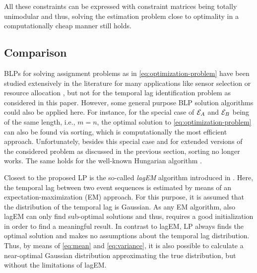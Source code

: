 \documentclass[journal, 10pt]{IEEEtran}
\begin{document}
All these constraints can be expressed with constraint matrices being totally unimodular and thus, solving the estimation problem close to optimality in a computationally cheap manner still holds.


\subsection{Comparison}
\label{sec:lp_comparison}
%
BLPs for solving assignment problems as in \eqref{eq:optimization-problem} have been studied extensively in the literature for many applications like sensor selection \cite{Moon2017} or resource allocation \cite{Sultan2011}, but not for the temporal lag identification problem as considered in this paper. However, some general purpose BLP solution algorithms could also be applied here. For instance, for the special case of $\mathcal E_A$ and $\mathcal E_B$ being of the same length, i.e., $m=n$, the optimal solution to \eqref{eq:optimization-problem} can also be found via sorting, which is computationally the most efficient approach. Unfortunately, besides this special case and for extended versions of the considered problem as discussed in the previous section, sorting no longer works. The same holds for the well-known Hungarian algorithm \cite{Kuhn1955}.

Closest to the proposed LP is the so-called \emph{lagEM} algorithm introduced in \cite{Zeng2015}. Here, the temporal lag between two event sequences is estimated by means of an expectation-maximization (EM) approach. For this purpose, it is assumed that the distribution of the temporal lag is Gaussian. As any EM algorithm, also lagEM can only find sub-optimal solutions and thus, requires a good initialization in order to find a meaningful result. In contrast to lagEM, LP always finds the optimal solution and makes no assumptions about the temporal lag distribution. Thus, by means of \eqref{eq:mean} and \eqref{eq:variance}, it is also possible to calculate a near-optimal Gaussian distribution approximating the true distribution, but without the limitations of lagEM.
\end{document}
